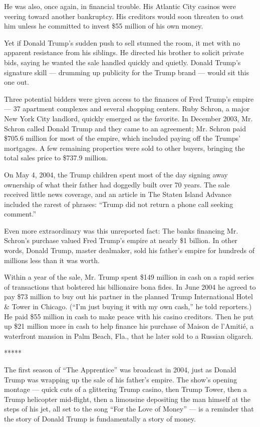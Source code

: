 He was also, once again, in financial trouble. His Atlantic City casinos
were veering toward another bankruptcy. His creditors would soon
threaten to oust him unless he committed to invest \$55 million of his
own money.

Yet if Donald Trump's sudden push to sell stunned the room, it met with
no apparent resistance from his siblings. He directed his brother to
solicit private bids, saying he wanted the sale handled quickly and
quietly. Donald Trump's signature skill --- drumming up publicity for
the Trump brand --- would sit this one out.

Three potential bidders were given access to the finances of Fred
Trump's empire --- 37 apartment complexes and several shopping centers.
Ruby Schron, a major New York City landlord, quickly emerged as the
favorite. In December 2003, Mr. Schron called Donald Trump and they came
to an agreement; Mr. Schron paid \$705.6 million for most of the empire,
which included paying off the Trumps' mortgages. A few remaining
properties were sold to other buyers, bringing the total sales price to
\$737.9 million.

On May 4, 2004, the Trump children spent most of the day signing away
ownership of what their father had doggedly built over 70 years. The
sale received little news coverage, and an article in The Staten Island
Advance included the rarest of phrases: ``Trump did not return a phone
call seeking comment.''

Even more extraordinary was this unreported fact: The banks financing
Mr. Schron's purchase valued Fred Trump's empire at nearly \$1 billion.
In other words, Donald Trump, master dealmaker, sold his father's empire
for hundreds of millions less than it was worth.

Within a year of the sale, Mr. Trump spent \$149 million in cash on a
rapid series of transactions that bolstered his billionaire bona fides.
In June 2004 he agreed to pay \$73 million to buy out his partner in the
planned Trump International Hotel \& Tower in Chicago. (``I'm just
buying it with my own cash,'' he told reporters.) He paid \$55 million
in cash to make peace with his casino creditors. Then he put up \$21
million more in cash to help finance his purchase of Maison de l'Amitié,
a waterfront mansion in Palm Beach, Fla., that he later sold to a
Russian oligarch.

*****

The first season of ``The Apprentice'' was broadcast in 2004, just as
Donald Trump was wrapping up the sale of his father's empire. The show's
opening montage --- quick cuts of a glittering Trump casino, then Trump
Tower, then a Trump helicopter mid-flight, then a limousine depositing
the man himself at the steps of his jet, all set to the song ``For the
Love of Money'' --- is a reminder that the story of Donald Trump is
fundamentally a story of money.

